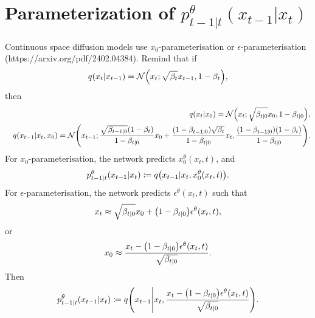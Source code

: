 \documentclass[10pt]{article}
\begin{document}
\section{Parameterization of $p_{t-1|t}^\theta(x_{t-1}|x_t)$}

Continuous space diffusion models use $x_0$-parameterisation or $\epsilon$-parameterisation (https://arxiv.org/pdf/2402.04384). Remind that if
\begin{eqnarray*}
  q(x_t|x_{t-1})=\mathcal{N}\qty(x_t;\sqrt{\beta_t}x_{t-1}, 1-\beta_t),
\end{eqnarray*}
then
\begin{eqnarray*}
  &&q(x_t|x_0)=\mathcal{N}\qty(x_t;\sqrt{\beta_{t|0}}x_0, 1-\beta_{t|0}),\\
  &&q(x_{t-1}|x_t,x_0)=\mathcal{N}\qty(x_{t-1};\frac{\sqrt{\beta_{t-1|0}}(1-\beta_t)}{1-\beta_{t|0}}x_0 + \frac{(1-\beta_{t-1|0})\sqrt{\beta_t}}{1-\beta_{t|0}}x_t, \frac{(1-\beta_{t-1|0})(1-\beta_t)}{1-\beta_{t|0}}).
\end{eqnarray*}
For $x_0$-parameterisation, the network predicts $x_0^\theta(x_t,t)$, and
\begin{eqnarray*}
  p_{t-1|t}^\theta(x_{t-1}|x_t) \coloneq q\qty(x_{t-1}|x_t, x_0^\theta(x_t,t)).
\end{eqnarray*}
For $\epsilon$-parameterisation, the network predicts $\epsilon^\theta(x_t,t)$ such that
\begin{eqnarray*}
  x_t\approx \sqrt{\beta_{t|0}} x_0 + \qty(1-\beta_{t|0}) \epsilon^\theta(x_t,t),
\end{eqnarray*}
or
\begin{eqnarray*}
  x_0 \approx \frac{x_t - \qty(1-\beta_{t|0}) \epsilon^\theta(x_t,t)}{\sqrt{\beta_{t|0}}}.
\end{eqnarray*}
Then
\begin{eqnarray*}
  p_{t-1|t}^\theta(x_{t-1}|x_t) \coloneq q\qty(x_{t-1} \middle| x_t, \frac{x_t - \qty(1-\beta_{t|0}) \epsilon^\theta(x_t,t)}{\sqrt{\beta_{t|0}}}).
\end{eqnarray*}
\end{document}
